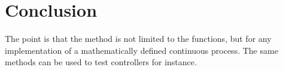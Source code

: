 \section{Conclusion}

The point is that the method is not limited to the functions, but for
any implementation of a mathematically defined continuous process. The
same methods can be used to test controllers for instance.

